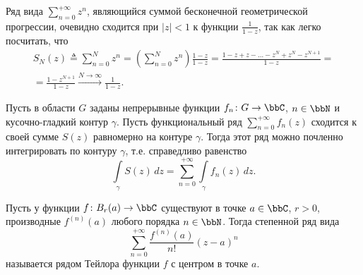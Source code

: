 \begin{exmpl} \label{exmpl2}
Ряд вида $\sum\limits_{n = 0}^{+\infty} z^n$, являющийся суммой бесконечной геометрической прогрессии, очевидно сходится при $|z| < 1$ к функции $\frac{1}{1 - z}$, так как легко посчитать, что
\begin{multline*}
S_N(z) \triangleq \sum\limits_{n = 0}^{N} z^n = \left( \sum\limits_{n = 0}^{N} z^n \right) \frac{1 - z}{1 - z} =\frac{1-z+z-\dots-z^N+z^N-z^{N+1}}{1-z}=\\= \frac{1 - z^{N + 1}}{1 - z}  \xrightarrow{N \to \infty} \frac{1}{1 - z}. \tag*{\qedhere}
\end{multline*}
\end{exmpl} 
\begin{stt} \label{ch34stt1000}
Пусть в области $G$ заданы непрерывные функции $f_n\colon G \to \bbC$, $n \in \bbN$ и кусочно-гладкий контур $\gamma$. Пусть функциональный ряд $\sum\limits_{n = 0}^{+\infty}f_n(z)$ сходится к своей сумме $S(z)$ равномерно на контуре $\gamma$. Тогда этот ряд можно почленно интегрировать по контуру $\gamma$, т.е. справедливо равенство 
\begin{equation} \label{ch34eq1000} 
\int\limits_{\gamma}S(z) \,dz = \sum\limits_{n = 0}^{+\infty} \int\limits_{\gamma} f_n(z) \,dz. 
\end{equation} 

\end{stt}
\begin{defn}
Пусть у функции $f \colon B_r(a) \to \bbC$ существуют в точке $a \in \bbC$, $r > 0$, производные $f^{(n)}(a)$ любого порядка $n \in \bbN$. Тогда степенной ряд вида
\begin{equation} \label{ch34.2eq4}
\sum\limits_{n = 0}^{+\infty} \frac{f^{(n)}(a)}{n!} (z - a)^n
\end{equation}
называется $\textit{рядом Тейлора функции f}$ с центром в точке $a$.
\end{defn}

